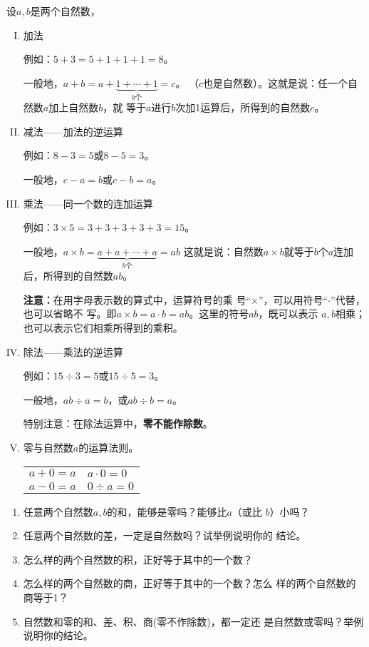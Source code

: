 设$a,b$是两个自然数，
\begin{enumerate}[I. ]
	\item 加法
	
	例如：$5+3=5+1+1+1=8$。
	
	一般地，$a+b=a+\underbrace{1 +\cdots +1}_{b\text{个}} =c$。  
	（$c$也是自然数）。这就是说：任一个自然数$a$加上自然数$b$，就
	等于$a$进行$b$次加1运算后，所得到的自然数$c$。
	\item 减法——加法的逆运算
	
	例如：$8-3=5$或$8-5=3$。
	
	一般地，$c-a=b$或$c-b=a$。
	\item 乘法——同一个数的连加运算
	
	例如：$3\times 5=3+3+3+3+3=15$。
	
	一般地，$a\times b =\underbrace{a+a+\cdots+a}_{b\text{个}}=ab$
	这就是说：自然数$a\times b$就等于$b$个$a$连加后，所得到的自然数$ab$。
	
	\textbf{注意：}在用字母表示数的算式中，运算符号的乘
	号“$\times$”，可以用符号“$\cdot$”代替，也可以省略不
	写。即$a\times b=a\cdot b=ab$。这里的符号$ab$，既可以表示
	$a,  b$相乘；也可以表示它们相乘所得到的乘积。
	
	\item 除法——乘法的逆运算
	
	例如：$15\div 3=5$或$15\div 5=3$。
	
	一般地，$ab\div a= b$，或$ab\div b = a$。
	
	特别注意：在除法运算中，\textbf{零不能作除数}。
	
	\item 零与自然数$a$的运算法则。
	\begin{center}
		\begin{tabular}{p{}p{}}
			$a+0=a$& $a\cdot 0=0$\\
			$a-0=a$&  $0\div a=0$   
		\end{tabular}
	\end{center}
	
\end{enumerate}         

\begin{ex}
	\begin{enumerate}
		\item 任意两个自然数$a,b$的和，能够是零吗？能够比$a$（或比
		$b$）小吗？
		\item 任意两个自然数的差，一定是自然数吗？试举例说明你的
		结论。
		\item 怎么样的两个自然数的积，正好等于其中的一个数？
		\item 怎么样的两个自然数的商，正好等于其中的一个数？怎么
		样的两个自然数的商等于1？
		\item 自然数和零的和、差、积、商(零不作除数)，都一定还
		是自然数或零吗？举例说明你的结论。
		
	\end{enumerate}
\end{ex}

